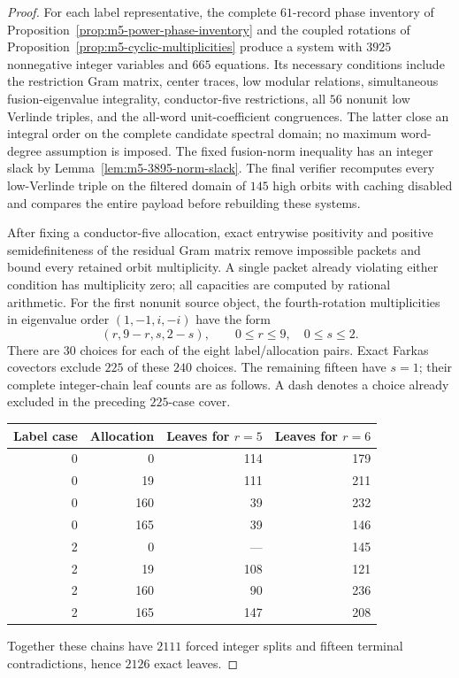 \begin{proof}
For each label representative, the complete $61$-record phase inventory
of Proposition~\ref{prop:m5-power-phase-inventory} and the coupled
rotations of Proposition~\ref{prop:m5-cyclic-multiplicities} produce a
system with $3925$ nonnegative integer variables and $665$ equations.
Its necessary conditions include the restriction Gram matrix, center
traces, low modular relations, simultaneous fusion-eigenvalue
integrality, conductor-five restrictions, all $56$ nonunit low Verlinde
triples, and the all-word unit-coefficient congruences.  The latter close
an integral order on the complete candidate spectral domain; no maximum
word-degree assumption is imposed.  The fixed fusion-norm inequality
has an integer slack by Lemma~\ref{lem:m5-3895-norm-slack}.
The final verifier recomputes every low-Verlinde triple on the filtered
domain of $145$ high orbits with caching disabled and compares the entire
payload before rebuilding these systems.

After fixing a conductor-five allocation, exact entrywise positivity
and positive semidefiniteness of the residual Gram matrix remove
impossible packets and bound every retained orbit multiplicity.  A
single packet already violating either condition has multiplicity zero;
all capacities are computed by rational arithmetic.  For the first
nonunit source object, the fourth-rotation multiplicities in eigenvalue
order $(1,-1,i,-i)$ have the form
\[
 (r,9-r,s,2-s),\qquad 0\le r\le9,\quad0\le s\le2.
\]
There are $30$ choices for each of the eight label/allocation pairs.
Exact Farkas covectors exclude $225$ of these $240$ choices.  The
remaining fifteen have $s=1$; their complete integer-chain leaf counts
are as follows.  A dash denotes a choice already excluded in the
preceding $225$-case cover.
\begin{center}
\begin{tabular}{@{}rrrr@{}}\toprule
Label case & Allocation & Leaves for $r=5$ & Leaves for $r=6$\\\midrule
0&0&114&179\\
0&19&111&211\\
0&160&39&232\\
0&165&39&146\\
2&0&---&145\\
2&19&108&121\\
2&160&90&236\\
2&165&147&208\\\bottomrule
\end{tabular}
\end{center}
Together these chains have $2111$ forced integer splits and fifteen
terminal contradictions, hence $2126$ exact leaves.


\end{proof}
